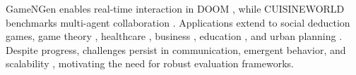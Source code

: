 
GameNGen enables real-time interaction in DOOM \citep{valeveski2024diffusion}, while CUISINEWORLD benchmarks multi-agent collaboration \citep{gong2023mindagent}. Applications extend to social deduction games, game theory \citep{xu2023magic}, healthcare \citep{ke2024enhancing, kim2024adaptive}, business \citep{chen2024agentverse}, education \citep{gosling2024multi}, and urban planning \citep{zhou2024largelanguagemodelparticipatory}. Despite progress, challenges persist in communication, emergent behavior, and scalability \citep{agashe2024llmcoordinationevaluatinganalyzingmultiagent}, motivating the need for robust evaluation frameworks.

